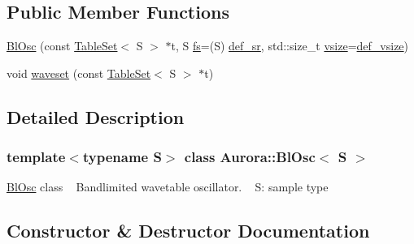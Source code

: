 \subsection*{Public Member Functions}
\begin{DoxyCompactItemize}
\item 
\hyperlink{class_aurora_1_1_bl_osc_a1159b66d0a05dfd677cde07f5547c257}{Bl\+Osc} (const \hyperlink{class_aurora_1_1_table_set}{Table\+Set}$<$ S $>$ $\ast$t, S \hyperlink{class_aurora_1_1_osc_a9ac3aa9006fc98588b2163e0e56f6e30}{fs}=(S) \hyperlink{namespace_aurora_ad49263d809bea98dd422e95bc91bc03e}{def\+\_\+sr}, std\+::size\+\_\+t \hyperlink{class_aurora_1_1_snd_base_af9e21aaf411b17f7a8221c991ce5d291}{vsize}=\hyperlink{namespace_aurora_afaaddf667a06e7ce23c667a8b7295263}{def\+\_\+vsize})
\item 
void \hyperlink{class_aurora_1_1_bl_osc_a7506391ee84bdd698904e4c0f14c446e}{waveset} (const \hyperlink{class_aurora_1_1_table_set}{Table\+Set}$<$ S $>$ $\ast$t)
\end{DoxyCompactItemize}


\subsection{Detailed Description}
\subsubsection*{template$<$typename S$>$\newline
class Aurora\+::\+Bl\+Osc$<$ S $>$}

\hyperlink{class_aurora_1_1_bl_osc}{Bl\+Osc} class ~\newline
Bandlimited wavetable oscillator. ~\newline
S\+: sample type 

\subsection{Constructor \& Destructor Documentation}
\mbox{\label{class_aurora_1_1_bl_osc_a1159b66d0a05dfd677cde07f5547c257}} 
